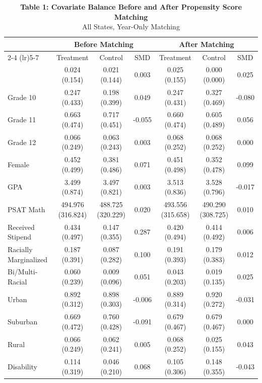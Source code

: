 \begin{table}[t]
\caption*{
{\fontsize{10}{12}\selectfont  \textbf{Table 1: Covariate Balance Before and After Propensity Score Matching}\fontsize{8}{10}\selectfont } \\ 
{\fontsize{8}{10}\selectfont  All States, Year-Only Matching\fontsize{8}{10}\selectfont }
} 
\fontsize{8.0pt}{10.0pt}\selectfont
\begin{tabular*}{\linewidth}{@{\extracolsep{\fill}}lcccccc}
\toprule
 & \multicolumn{3}{c}{Before Matching} & \multicolumn{3}{c}{After Matching} \\ 
\cmidrule(lr){2-4} \cmidrule(lr){5-7}
 & Treatment & Control & SMD & Treatment & Control & SMD \\ 
\midrule\addlinespace[2.5pt]
{Grade 9} & {0.024 (0.154)} & {0.021 (0.144)} & {0.003} & {0.025 (0.155)} & {0.000 (0.000)} & {0.025} \\ 
Grade 10 & 0.247 (0.433) & 0.198 (0.399) & 0.049 & 0.247 (0.431) & 0.327 (0.469) & -0.080 \\ 
Grade 11 & 0.663 (0.474) & 0.717 (0.451) & -0.055 & 0.660 (0.474) & 0.605 (0.489) & 0.056 \\ 
Grade 12 & 0.066 (0.249) & 0.063 (0.243) & 0.003 & 0.068 (0.252) & 0.068 (0.252) & 0.000 \\ 
Female & 0.452 (0.499) & 0.381 (0.486) & 0.071 & 0.451 (0.498) & 0.352 (0.478) & 0.099 \\ 
GPA & 3.499 (0.874) & 3.497 (0.821) & 0.003 & 3.513 (0.836) & 3.528 (0.796) & -0.017 \\ 
PSAT Math & 494.976 (316.824) & 488.725 (320.229) & 0.020 & 493.556 (315.658) & 490.290 (308.725) & 0.010 \\ 
Received Stipend & 0.434 (0.497) & 0.147 (0.355) & 0.287 & 0.420 (0.494) & 0.414 (0.492) & 0.006 \\ 
Racially Marginalized & 0.187 (0.391) & 0.087 (0.282) & 0.100 & 0.191 (0.393) & 0.179 (0.383) & 0.012 \\ 
Bi/Multi-Racial & 0.060 (0.239) & 0.009 (0.096) & 0.051 & 0.043 (0.203) & 0.019 (0.135) & 0.025 \\ 
Urban & 0.892 (0.312) & 0.898 (0.303) & -0.006 & 0.889 (0.314) & 0.920 (0.272) & -0.031 \\ 
Suburban & 0.669 (0.472) & 0.760 (0.428) & -0.091 & 0.679 (0.467) & 0.679 (0.467) & 0.000 \\ 
Rural & 0.066 (0.249) & 0.062 (0.241) & 0.005 & 0.068 (0.252) & 0.025 (0.155) & 0.043 \\ 
Disability & 0.114 (0.319) & 0.046 (0.210) & 0.068 & 0.105 (0.306) & 0.148 (0.355) & -0.043 \\ 

\end{tabular*}
\end{table}
